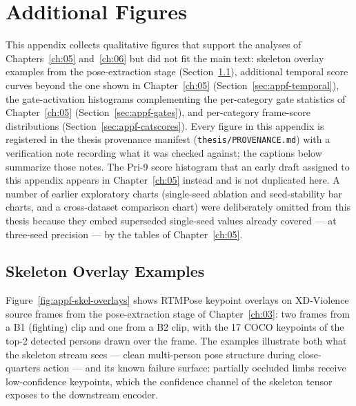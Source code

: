 \chapter{Additional Figures}
\label{app:f}

This appendix collects qualitative figures that support the analyses of
Chapters~\ref{ch:05} and~\ref{ch:06} but did not fit the main text: skeleton
overlay examples from the pose-extraction stage
(Section~\ref{sec:appf-overlays}), additional temporal score curves beyond the
one shown in Chapter~\ref{ch:05} (Section~\ref{sec:appf-temporal}), the
gate-activation histograms complementing the per-category gate statistics of
Chapter~\ref{ch:05} (Section~\ref{sec:appf-gates}), and per-category
frame-score distributions (Section~\ref{sec:appf-catscores}). Every figure in
this appendix is registered in the thesis provenance manifest
(\texttt{thesis/PROVENANCE.md}) with a verification note recording what it was
checked against; the captions below summarize those notes. The Pri-9 score
histogram that an early draft assigned to this appendix appears in
Chapter~\ref{ch:05} instead and is not duplicated here. A number of
earlier exploratory charts (single-seed ablation and seed-stability bar
charts, and a cross-dataset comparison chart) were deliberately omitted from
this thesis because they embed superseded single-seed values already covered
--- at three-seed precision --- by the tables of Chapter~\ref{ch:05}.

\section{Skeleton Overlay Examples}
\label{sec:appf-overlays}

Figure~\ref{fig:appf-skel-overlays} shows RTMPose keypoint overlays on
XD-Violence source frames from the pose-extraction stage of
Chapter~\ref{ch:03}: two frames from a B1 (fighting) clip and one from a B2
clip, with the 17 COCO keypoints of the top-2 detected persons drawn over the
frame. The examples illustrate both what the skeleton stream sees --- clean
multi-person pose structure during close-quarters action --- and its known
failure surface: partially occluded limbs receive low-confidence keypoints,
which the confidence channel of the skeleton tensor exposes to the downstream
encoder.

